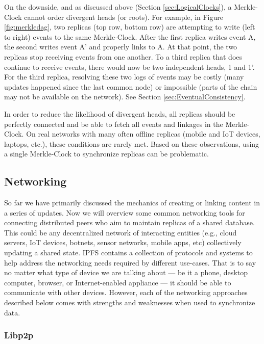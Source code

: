 \documentclass{textile}
\begin{document}
On the downside, and as discussed above (Section \ref{sec:LogicalClocks}), a Merkle-Clock cannot order divergent heads (or roots). For example, in Figure \ref{fig:merkledag}, two replicas (top row, bottom row) are attempting to write (left to right) events to the same Merkle-Clock. After the first replica writes event A, the second writes event A' and properly links to A. At that point, the two replicas stop receiving events from one another. To a third replica that does continue to receive events, there would now be two independent heads, 1 and 1'. For the third replica, resolving these two logs of events may be costly (many updates happened since the last common node) or impossible (parts of the chain may not be available on the network). See Section  \ref{sec:EventualConsistency}.

In order to reduce the likelihood of divergent heads, all replicas should be perfectly connected and be able to fetch all events and linkages in the Merkle-Clock. On real networks with many often offline replicas (mobile and IoT devices, laptops, etc.), these conditions are rarely met. Based on these observations, using a single Merkle-Clock to synchronize replicas can be problematic.

\FloatBarrier

\subsection{Networking}

So far we have primarily discussed the mechanics of creating or linking content in a series of updates. Now we will overview some common networking tools for connecting distributed peers who aim to maintain replicas of a shared database. This could be any decentralized network of interacting entities (e.g., cloud servers, IoT devices, botnets, sensor networks, mobile apps, etc) collectively updating a shared state. IPFS contains a collection of protocols and systems to help address the networking needs required by different use-cases. That is to say no matter what type of device we are talking about --- be it a phone, desktop computer, browser, or Internet-enabled appliance --- it should be able to communicate with other devices. However, each of the networking approaches described below comes with strengths and weaknesses when used to synchronize data.

\subsubsection{Libp2p}
\end{document}
